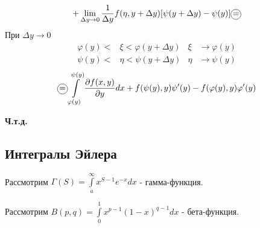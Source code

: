 \documentclass[12pt]{article}
\newcommand*\circled[1]{\tikz[baseline=(char.base)]{
    \node[shape=circle, draw, inner sep=1pt, 
        minimum height=12pt] (char) {#1};}}
\let\oldint\int
\let\oldlim\lim
\renewcommand{\int}{\oldint\limits}
\renewcommand{\lim}{\oldlim\limits}
\begin{document}
\begin{adjustwidth}{1.5em}{1.5em}
\begin{gather*}
          + \lim_{\Delta y \to 0}\frac{1}{\Delta y}f(\eta, y + \Delta y)[ \psi(y + \Delta y) - \psi(y)] \circled{=}
      \end{gather*}
      При $\Delta y \to 0$
      \begin{align*}
          \varphi(y) < &\xi < \varphi(y + \Delta y) & \xi &\to \varphi(y)\\
          \psi(y) < &\eta < \psi(y + \Delta y) & \eta &\to \psi(y)
      \end{align*}
      \[ \circled{=} \int_{\varphi(y)}^{\psi(y)} \frac{\partial f(x, y)}{\partial y}dx + f(\psi(y), y)\psi'(y) - f(\varphi(y), y)\varphi'(y) \]
      \begin{center}
          \textbf{Ч.т.д.}
      \end{center}
    \end{adjustwidth}
  
    \subsection{Интегралы Эйлера}
    Рассмотрим $\Gamma(S) = \int_{a}^{\infty}x^{S-1}e^{-x}dx$ - гамма-функция.\par\noindent
    Рассмотрим $B(p,q) = \int_{0}^{1}x^{p-1}(1-x)^{q-1}dx$ - бета-функция.
    
\end{document}
